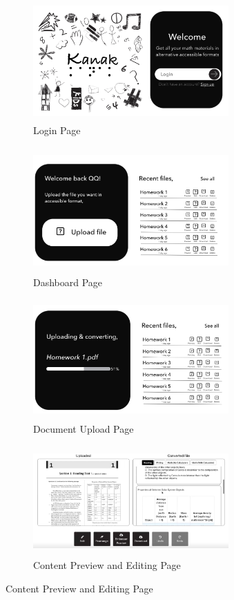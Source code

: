 \begin{figure}[!ht]
  \centering

  \begin{subfigure}[t]{0.48\textwidth}
    \includegraphics[width=75mm, height=46mm]{images/login2.png}
    \caption{Login Page}
  \end{subfigure}
  \hfill
  \begin{subfigure}[t]{0.48\textwidth}
    \includegraphics[width=75mm, height=48mm]{images/dashboard2.png}
    \caption{Dashboard Page}
  \end{subfigure}

  \vspace{1em}

    \begin{subfigure}[t]{0.48\textwidth}
    \includegraphics[width=75mm, height=46mm]{images/upload2.png}
    \caption{Document Upload Page}
  \end{subfigure}
    \hfill
  \begin{subfigure}[t]{0.48\textwidth}
    \includegraphics[width=75mm, height=42mm]{images/extract2.png}
    \caption{Content Preview and Editing Page}
  \end{subfigure}




\end{figure}
